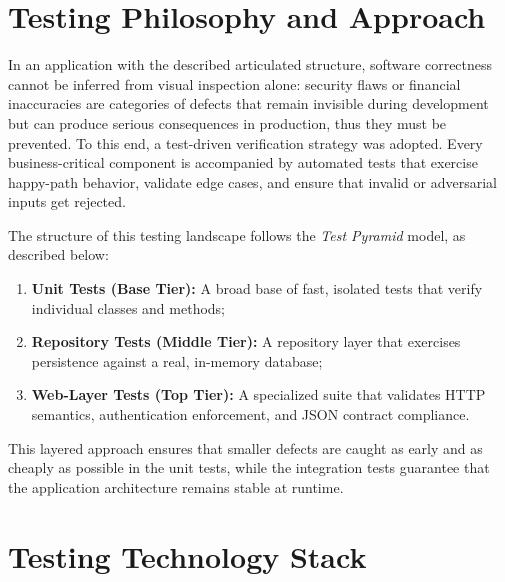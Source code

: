 \section{Testing Philosophy and Approach}
In an application with the described articulated structure, software correctness cannot be inferred from visual inspection alone: security flaws or financial inaccuracies are categories of defects that remain invisible during development but can produce serious consequences in production, thus they must be prevented. To this end, a test-driven verification strategy was adopted. Every business-critical component is accompanied by automated tests that exercise happy-path behavior, validate edge cases, and ensure that invalid or adversarial inputs get rejected.

The structure of this testing landscape follows the \emph{Test Pyramid} model, as described below:
\begin{enumerate}[itemsep=4pt, parsep=0pt]
    \item \textbf{Unit Tests (Base Tier):} A broad base of fast, isolated tests that verify individual classes and methods;
    \item \textbf{Repository Tests (Middle Tier):} A repository layer that exercises persistence against a real, in-memory database;
    \item \textbf{Web-Layer Tests (Top Tier):} A specialized suite that validates HTTP semantics, authentication enforcement, and JSON contract compliance.
\end{enumerate}
This layered approach ensures that smaller defects are caught as early and as cheaply as possible in the unit tests, while the integration tests guarantee that the application architecture remains stable at runtime.

\section{Testing Technology Stack}

